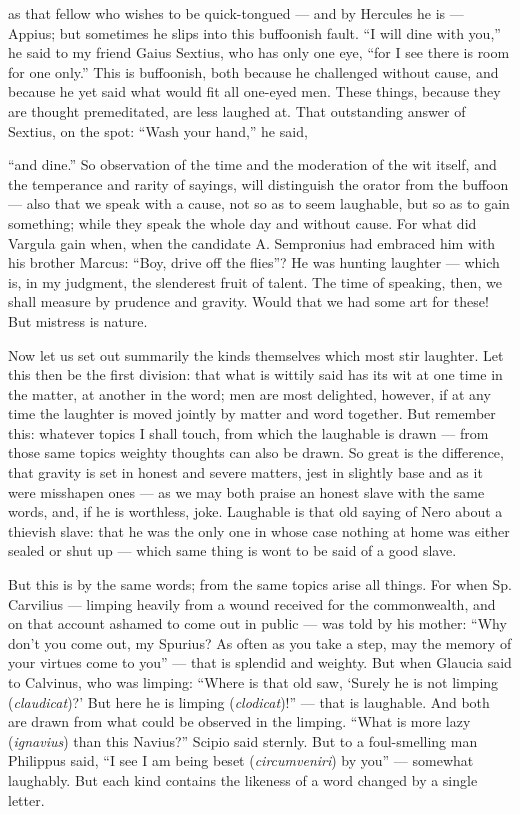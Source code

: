  as that fellow who wishes to be quick-tongued — and by Hercules he is — Appius; but sometimes he slips into this buffoonish fault. ``I will dine with you,'' he said to my friend Gaius Sextius, who has only one eye, ``for I see there is room for one only.'' This is buffoonish, both because he challenged without cause, and because he yet said what would fit all one-eyed men. These things, because they are thought premeditated, are less laughed at. That outstanding answer of Sextius, on the spot: ``Wash your hand,'' he said,

 ``and dine.'' So observation of the time and the moderation of the wit itself, and the temperance and rarity of sayings, will distinguish the orator from the buffoon — also that we speak with a cause, not so as to seem laughable, but so as to gain something; while they speak the whole day and without cause. For what did Vargula gain when, when the candidate A. Sempronius had embraced him with his brother Marcus: ``Boy, drive off the flies''? He was hunting laughter — which is, in my judgment, the slenderest fruit of talent. The time of speaking, then, we shall measure by prudence and gravity. Would that we had some art for these! But mistress is nature.

 Now let us set out summarily the kinds themselves which most stir laughter. Let this then be the first division: that what is wittily said has its wit at one time in the matter, at another in the word; men are most delighted, however, if at any time the laughter is moved jointly by matter and word together. But remember this: whatever topics I shall touch, from which the laughable is drawn — from those same topics weighty thoughts can also be drawn. So great is the difference, that gravity is set in honest and severe matters, jest in slightly base and as it were misshapen ones — as we may both praise an honest slave with the same words, and, if he is worthless, joke. Laughable is that old saying of Nero about a thievish slave: that he was the only one in whose case nothing at home was either sealed or shut up — which same thing is wont to be said of a good slave.

 But this is by the same words; from the same topics arise all things. For when Sp. Carvilius — limping heavily from a wound received for the commonwealth, and on that account ashamed to come out in public — was told by his mother: ``Why don't you come out, my Spurius? As often as you take a step, may the memory of your virtues come to you'' — that is splendid and weighty. But when Glaucia said to Calvinus, who was limping: ``Where is that old saw, `Surely he is not limping (\textit{claudicat})?' But here he is limping (\textit{clodicat})!'' — that is laughable. And both are drawn from what could be observed in the limping. ``What is more lazy (\textit{ignavius}) than this Navius?'' Scipio said sternly. But to a foul-smelling man Philippus said, ``I see I am being beset (\textit{circumveniri}) by you'' — somewhat laughably. But each kind contains the likeness of a word changed by a single letter.

